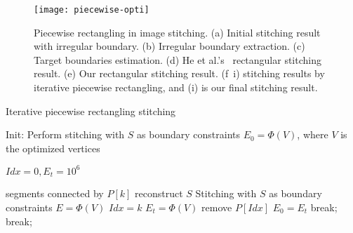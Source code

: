 \documentclass[10pt,journal,compsoc]{IEEEtran}
\begin{document}
\begin{figure*}
  \centering
  \texttt{[image: piecewise-opti]}
  \caption{Piecewise rectangling in image stitching. (a) Initial stitching result with irregular boundary. (b) Irregular boundary extraction. (c) Target boundaries estimation.
  (d) He et al.'s~\cite{journals/tog/HeC013} rectangular stitching result. (e) Our rectangular stitching result. (f~i) stitching results by iterative piecewise rectangling, and (i) is our final stitching result. } \label{fig:piecewise-process}
\end{figure*}


\begin{algorithm}
 \label{alg:piecewise_rectangling}
     \caption{Iterative piecewise rectangling stitching}
      Init: Perform stitching with $S$ as boundary constraints\;
      $E_0 = \Phi(V)$, where $V$ is the optimized vertices\;
      {
           $Idx=0, E_t=10^6$\;

           {
                  segments connected by $P[k]$\;
                  reconstruct $S$\;
                  Stitching with $S$ as boundary constraints\;
                  $E = \Phi(V)$\;
                  {
                       $Idx=k$\;
                        $E_t = \Phi(V)$\;
                  }
           }
           {
                remove $P[Idx]$\;
                $E_0=E_t$\;
           }
           \Else
           {
                break;
           }
           {
               break;
           }
      }
\end{algorithm}
\end{document}
